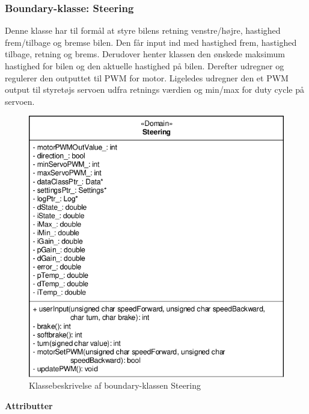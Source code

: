 
\subsubsection{Boundary-klasse: Steering}
Denne klasse har til formål at styre bilens retning venstre/højre, hastighed frem/tilbage og bremse bilen. Den får input ind med hastighed frem, hastighed tilbage, retning og brems. Derudover henter klassen den ønskede maksimum hastighed for bilen og den aktuelle hastighed på bilen. Derefter udregner og regulerer den outputtet til PWM for motor. Ligeledes udregner den et PWM output til styretøjs servoen udfra retnings værdien og min/max for duty cycle på servoen.


\begin{figure}[h]
\centering
\includegraphics[]{../fig/diagrammer/bil/cd_steering.pdf}
\caption{Klassebeskrivelse af boundary-klassen Steering}
\label{fig:cd_Steering}
\end{figure}

\clearpage

\textbf{Attributter}

